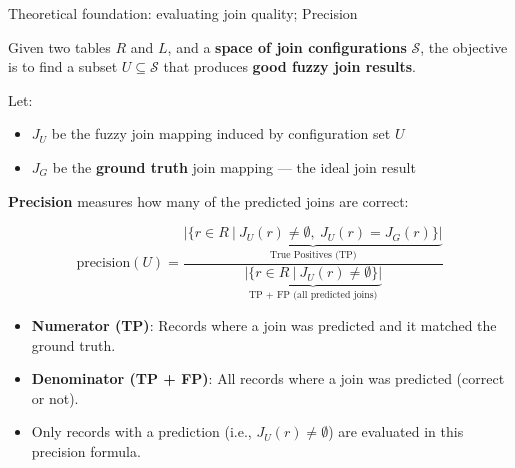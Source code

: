 \documentclass[8pt]{beamer} %
\begin{document}
\begin{frame}{Theoretical foundation: evaluating join quality; Precision}
	
	Given two tables $R$ and $L$, and a \textbf{space of join configurations} $\mathcal{S}$, the objective is to find a subset $U \subseteq \mathcal{S}$ that produces \textbf{good fuzzy join results}.
	
	Let:
	\begin{itemize}
		\item $J_U$ be the fuzzy join mapping induced by configuration set $U$
		\item $J_G$ be the \textbf{ground truth} join mapping — the ideal join result
	\end{itemize}
	
	\vspace{0.5em}
	\textbf{Precision} measures how many of the predicted joins are correct:
	
	$$
	\text{precision}(U) =
	\frac{
		\underbrace{|\{ r \in R\ |\ J_U(r) \neq \emptyset,\ J_U(r) = J_G(r) \}|}_{\text{True Positives (TP)}}
	}{
		\underbrace{|\{ r \in R\ |\ J_U(r) \neq \emptyset \}|}_{\text{TP + FP (all predicted joins)}}
	}
	$$
	
	\begin{itemize}
		\item \textbf{Numerator (TP)}: Records where a join was predicted and it matched the ground truth.
		\item \textbf{Denominator (TP + FP)}: All records where a join was predicted (correct or not).
		\item Only records with a prediction (i.e., $J_U(r) \neq \emptyset$) are evaluated in this precision formula.
	\end{itemize}
	
\end{frame}
\end{document}
